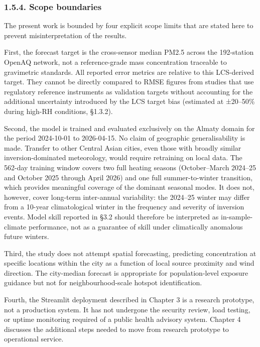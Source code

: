 \subsubsection{1.5.4. Scope boundaries}\label{scope-boundaries}

The present work is bounded by four explicit scope limits that are stated here to prevent misinterpretation of the results.

First, the forecast target is the cross-sensor median PM2.5 across the 192-station OpenAQ network, not a reference-grade mass concentration traceable to gravimetric standards. All reported error metrics are relative to this LCS-derived target. They cannot be directly compared to RMSE figures from studies that use regulatory reference instruments as validation targets without accounting for the additional uncertainty introduced by the LCS target bias (estimated at ±20--50\% during high-RH conditions, §1.3.2).

Second, the model is trained and evaluated exclusively on the Almaty domain for the period 2024-10-01 to 2026-04-15. No claim of geographic generalisability is made. Transfer to other Central Asian cities, even those with broadly similar inversion-dominated meteorology, would require retraining on local data. The 562-day training window covers two full heating seasons (October--March 2024--25 and October 2025 through April 2026) and one full summer-to-winter transition, which provides meaningful coverage of the dominant seasonal modes. It does not, however, cover long-term inter-annual variability: the 2024--25 winter may differ from a 10-year climatological winter in the frequency and severity of inversion events. Model skill reported in §3.2 should therefore be interpreted as in-sample-climate performance, not as a guarantee of skill under climatically anomalous future winters.

Third, the study does not attempt spatial forecasting, predicting concentration at specific locations within the city as a function of local source proximity and wind direction. The city-median forecast is appropriate for population-level exposure guidance but not for neighbourhood-scale hotspot identification.

Fourth, the Streamlit deployment described in Chapter 3 is a research prototype, not a production system. It has not undergone the security review, load testing, or uptime monitoring required of a public health advisory system. Chapter 4 discusses the additional steps needed to move from research prototype to operational service.

